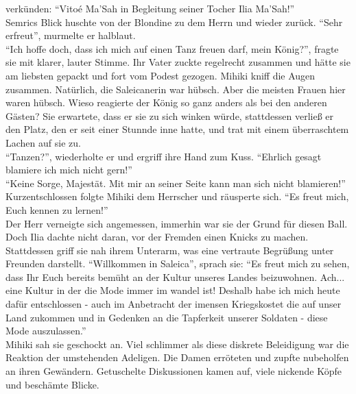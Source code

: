 verkünden: ``Vitoé Ma'Sah in Begleitung seiner Tocher Ilia Ma'Sah!''\\
Semrics Blick huschte von der Blondine zu dem Herrn und wieder zurück. ``Sehr erfreut'', murmelte 
er halblaut.\\
``Ich hoffe doch, dass ich mich auf einen Tanz freuen darf, mein König?'', fragte sie mit klarer, 
lauter Stimme. Ihr Vater zuckte regelrecht zusammen und hätte sie am liebsten gepackt und fort vom 
Podest gezogen. Mihiki kniff die Augen zusammen. Natürlich, die Saleicanerin war hübsch. Aber die 
meisten Frauen hier waren hübsch. Wieso reagierte der König so ganz anders als bei den anderen 
Gästen? Sie erwartete, dass er sie zu sich winken würde, stattdessen verließ er den Platz, den er 
seit einer Stunnde inne hatte, und trat mit einem überraschtem Lachen auf sie zu.\\
``Tanzen?'', wiederholte er und ergriff ihre Hand zum Kuss. ``Ehrlich gesagt blamiere ich mich 
nicht gern!''\\
``Keine Sorge, Majestät. Mit mir an seiner Seite kann man sich nicht blamieren!''\\
Kurzentschlossen folgte Mihiki dem Herrscher und räusperte sich. ``Es freut mich, Euch kennen zu 
lernen!''\\
Der Herr verneigte sich angemessen, immerhin war sie der Grund für diesen Ball. Doch Ilia dachte 
nicht daran, vor der Fremden einen Knicks zu machen. Stattdessen griff sie nah ihrem Unterarm, was 
eine vertraute Begrüßung unter Freunden darstellt. ``Willkommen in Saleica'', sprach sie: ``Es 
freut mich zu sehen, dass Ihr Euch bereits bemüht an der Kultur unseres Landes beizuwohnen. Ach... 
eine Kultur in der die Mode immer im wandel ist! Deshalb habe ich mich heute dafür entschlossen - 
auch im Anbetracht der imensen Kriegskostet die auf unser Land zukommen und in Gedenken an die 
Tapferkeit unserer Soldaten - diese Mode auszulassen.''\\
Mihiki sah sie geschockt an. Viel schlimmer als diese diskrete Beleidigung war die Reaktion der 
umstehenden Adeligen. Die Damen erröteten und zupfte nubeholfen an ihren Gewändern. Getuschelte 
Diskussionen kamen auf, viele nickende Köpfe und beschämte Blicke. 

